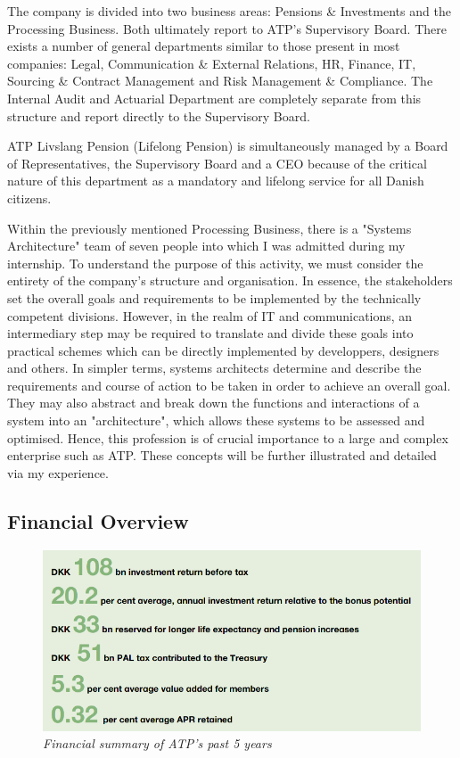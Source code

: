 \documentclass[11pt,titlepage]{article}
\begin{document}
The company is divided into two business areas: Pensions \& Investments and the Processing Business. Both ultimately report to ATP’s Supervisory Board. There exists a number of general departments similar to those present in most companies: Legal, Communication \& External Relations, HR, Finance, IT, Sourcing \& Contract Management and Risk Management \& Compliance. The Internal Audit and Actuarial Department are completely separate from this structure and report directly to the Supervisory Board.\cite{about_atp}

ATP Livslang Pension (Lifelong Pension) is simultaneously managed by a Board of Representatives, the Supervisory Board and a CEO because of the critical nature of this department as a mandatory and lifelong service for all Danish citizens.\cite{about_atp,anno_report}

Within the previously mentioned Processing Business, there is a "Systems Architecture" team of seven people into which I was admitted during my internship. To understand the purpose of this activity, we must consider the entirety of the company's structure and organisation. In essence, the stakeholders set the overall goals and requirements to be implemented by the technically competent divisions. However, in the realm of IT and communications, an intermediary step may be required to translate and divide these goals into practical schemes which can be directly implemented by developpers, designers and others. In simpler terms, systems architects determine and describe the requirements and course of action to be taken in order to achieve an overall goal. They may also abstract and break down the functions and interactions of a system into an "architecture", which allows these systems to be assessed and optimised.\cite{sys_arch} Hence, this profession is of crucial importance to a large and complex enterprise such as ATP. These concepts will be further illustrated and detailed via my experience.

\subsection{Financial Overview}

\begin{figure}[H]
    \centering
    \includegraphics[width=1.00\textwidth]{image5.png}
    \caption*{\textit{Financial summary of ATP's past 5 years\cite{anno_report}}}
\end{figure}
\end{document}
